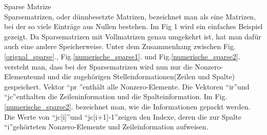 
Sparse Matrize\\
Sparsematrizen, oder dünnbesetzte Matrizen,  bezeichnet man als eine Matrizen, bei der so viele Einträge aus Nullen bestehen. Im Fig 1 wird ein einfaches Beispiel gezeigt.
Da Sparsematrizen mit Vollmatrizen genau umgekehrt ist, hat man dafür auch eine andere Speicherweise. Unter dem Zusammenhang zwischen Fig.\ref{orignal_sparse}., Fig.\ref{numerische_sparse1}. und Fig.\ref{numerische_sparse2}. versteht man, dass bei der Sparsematrizen wird nun nur die Nonzero-Elementeund und die zugehörigen Stelleinformationen(Zeilen und Spalte) gespeichert. Vektor \textquotedblleft pr \textquotedblright enthält alle Nonzero-Elemente. Die Vektoren \textquotedblleft ir\textquotedblright und \textquotedblleft jc\textquotedblright enthalten die Zeileninformation und die Spalteinformation. Im Fig.\ref{numerische_sparse2}. bezeichnet man, wie die Informationen gepackt werden. Die Werte von \textquotedblleft jc[i]\textquotedblright und \textquotedblleft jc[i+1]-1\textquotedblright zeigen den Indexe, deren die zur Spalte \textquotedblleft i\textquotedblright  gehörteten Nonzero-Elemente und Zeileinformation aufweisen.




